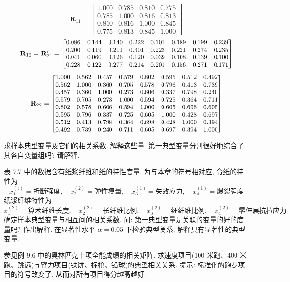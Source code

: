 
\[
\mathbf{R}_{11}=\begin{bmatrix}1.000&0.785&0.810&0.775\\0.785&1.000&0.816&0.813\\0.810&0.816&1.000&0.845\\0.775&0.813&0.845&1.000\end{bmatrix}
\]
\[
{\small
\mathbf{R}_{12}=\mathbf{R}'_{21}=\begin{bmatrix}0.086&0.144&0.140&0.222&0.101&0.189&0.199&0.239\\0.200&0.119&0.211&0.301&0.223&0.221&0.274&0.235\\0.041&0.060&0.126&0.120&0.039&0.108&0.139&0.100\\0.228&0.122&0.277&0.214&0.201&0.156&0.271&0.171\end{bmatrix}
}
\]
\[
{\small
\mathbf{R}_{22}=\begin{bmatrix}1.000&0.562&0.457&0.579&0.802&0.595&0.512&0.492\\0.562&1.000&0.360&0.705&0.578&0.796&0.413&0.739\\0.457&0.360&1.000&0.273&0.606&0.337&0.798&0.240\\0.579&0.705&0.273&1.000&0.594&0.725&0.364&0.711\\0.802&0.578&0.606&0.594&1.000&0.605&0.698&0.605\\0.595&0.796&0.337&0.725&0.605&1.000&0.428&0.697\\0.512&0.413&0.798&0.364&0.698&0.428&1.000&0.394\\0.492&0.739&0.240&0.711&0.605&0.697&0.394&1.000\end{bmatrix}
}
\]

求样本典型变量及它们的相关系数. 解释这些量. 第一典型变量分别很好地综合了其各自变量组吗? 请解释.

\quad \hyperref[tab:7.7]{表 7.7} 中的数据含有纸浆纤维和纸的特性度量. 为与本章的符号相对应, 令纸的特性为
\[
x_1^{(1)}=\text{折断强度},\quad x_2^{(2)}=\text{弹性模量},\quad x_3^{(1)}=\text{失效应力},\quad x_4^{(1)}=\text{爆裂强度}
\]
纸浆纤维特性为
\[
x_1^{(2)}=\text{算术纤维长度},\quad x_2^{(2)}=\text{长纤维比例},\quad x_3^{(2)}=\text{细纤维比例},\quad x_4^{(2)}=\text{零伸展抗拉应力}
\]
确定样本典型变量与相互间的相关系数. 问: 第一典型变量是关联的变量的好的度量吗? 作出解释. 在显著性水平 $\alpha=0.05$ 下检验典型关系. 解释具有显著性的典型变量.

\quad 参见例 9.6 中的奥林匹克十项全能成绩的相关矩阵. 求速度项目(100 米跑、400 米跑、跳远)与臂力项目(铁饼、标枪、铅球)的典型相关关系. 提示: 标准化的跑步项目的符号改变了, 从而对所有项目得分越高越好.

